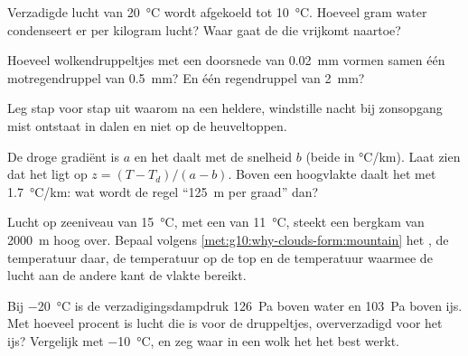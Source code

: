 \begin{exercise}[$\star\star$]\label{exo:g10:why-clouds-form:9}
Verzadigde lucht van \qty{20}{\degreeCelsius} wordt afgekoeld tot
\qty{10}{\degreeCelsius}. Hoeveel gram water condenseert er per kilogram lucht?
Waar gaat de  die vrijkomt naartoe?
\end{exercise}

\begin{exercise}[$\star\star$]\label{exo:g10:why-clouds-form:10}
Hoeveel wolkendruppeltjes met een doorsnede van \qty{0.02}{mm} vormen samen één
motregendruppel van \qty{0.5}{mm}? En één regendruppel van \qty{2}{mm}?
\end{exercise}

\begin{exercise}[$\star\star$]\label{exo:g10:why-clouds-form:11}
Leg stap voor stap uit waarom na een heldere, windstille nacht bij zonsopgang
mist ontstaat in dalen en niet op de heuveltoppen.
\end{exercise}

\begin{exercise}[$\star\star\star$]\label{exo:g10:why-clouds-form:12}
De droge gradiënt is $a$ en het  daalt met de snelheid $b$ (beide in
\unit{\degreeCelsius/km}). Laat zien dat het  ligt op
$z = (T - T_d)/(a - b)$. Boven een hoogvlakte daalt het  met
\qty{1.7}{\degreeCelsius/km}: wat wordt de regel ``\qty{125}{m} per graad''
dan?
\end{exercise}

\begin{exercise}[$\star\star\star$]\label{exo:g10:why-clouds-form:13}
Lucht op zeeniveau van \qty{15}{\degreeCelsius}, met een  van
\qty{11}{\degreeCelsius}, steekt een bergkam van \qty{2000}{m} hoog over. Bepaal
volgens \cref{met:g10:why-clouds-form:mountain} het , de
temperatuur daar, de temperatuur op de top en de temperatuur waarmee de lucht
aan de andere kant de vlakte bereikt.
\end{exercise}

\begin{exercise}[$\star\star\star$]\label{exo:g10:why-clouds-form:14}
Bij \qty{-20}{\degreeCelsius} is de verzadigingsdampdruk \qty{126}{Pa} boven
water en \qty{103}{Pa} boven ijs. Met hoeveel procent is lucht die  is
voor de druppeltjes, oververzadigd voor het ijs? Vergelijk met
\qty{-10}{\degreeCelsius}, en zeg waar in een wolk het  het best
werkt.
\end{exercise}

